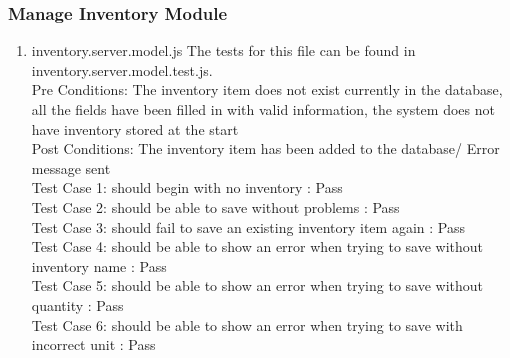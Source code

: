 \documentclass[a4paper,12pt]{report}
\begin{document}
 \subsubsection{Manage Inventory Module  }
\begin{enumerate}
\item inventory.server.model.js
 The tests for this file can be found in inventory.server.model.test.js. \\
Pre Conditions: The inventory item does not exist currently in the database,
all the fields have been filled in with valid information, the system does not have inventory stored at the start \\
Post Conditions: The inventory item has been added to the database/  Error message sent\\
Test Case 1: should begin with no inventory : Pass\\
Test Case 2: should be able to save without problems : Pass\\
Test Case 3: should fail to save an existing inventory item again : Pass\\
Test Case 4: should be able to show an error when trying to save without inventory name : Pass\\
Test Case 5: should be able to show an error when trying to save without quantity : Pass\\
Test Case 6: should be able to show an error when trying to save with incorrect unit : Pass\\
 \end{enumerate}
\end{document}
